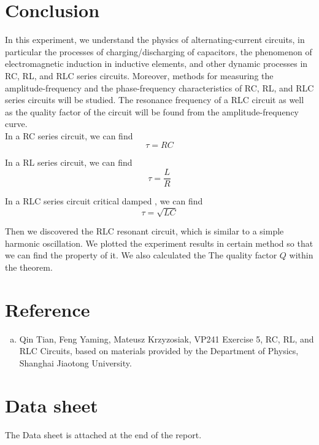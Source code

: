 \documentclass{article}
\begin{document}
\section{Conclusion}
In this experiment, we understand the physics of alternating-current circuits, in particular the processes of charging/discharging of capacitors, the phenomenon of electromagnetic induction in inductive elements, and other dynamic processes in RC, RL, and RLC series circuits. Moreover, methods for measuring the amplitude-frequency and the phase-frequency characteristics of RC, RL, and RLC series circuits will be studied. The resonance frequency of a RLC circuit as well as the quality factor of the circuit will be found from the amplitude-frequency curve.\\

In a RC series circuit, we can find
$$\tau=RC$$

In a RL series circuit, we can find
$$\tau=\frac{L}{R}$$

In a RLC series circuit critical damped , we can find
$$\tau=\sqrt{LC}$$

Then we discovered the RLC resonant circuit, which is similar to a simple harmonic oscillation. We plotted the experiment results in certain method so that we can find the property of it. We also calculated the The quality factor $Q$ within the theorem.

\section{Reference}

\begin{enumerate}[(a)]
	\item
	Qin Tian, Feng Yaming, Mateusz Krzyzosiak, VP241 Exercise 5, RC, RL, and RLC Circuits, based on materials provided by the Department of Physics, Shanghai Jiaotong University.
\end{enumerate}

\section{Data sheet}

The Data sheet is attached at the end of the report.
\end{document}
